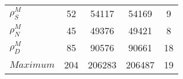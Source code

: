 \begin{center}
\begin{longtable}{lcccc}
$ {\rho^{M}_{S}}       $	 & 	                   52	 & 	                54117	 & 	                54169	 & 	                    9 \\ 
$ {\rho^{M}_{N}}       $	 & 	                   45	 & 	                49376	 & 	                49421	 & 	                    8 \\ 
$ {\rho^{M}_{D}}       $	 & 	                   85	 & 	                90576	 & 	                90661	 & 	                   18 \\ 
$Maximum               $	 & 	                  204	 & 	               206283	 & 	               206487	 & 	                   19 \\ 
\end{longtable}
 \end{center}
